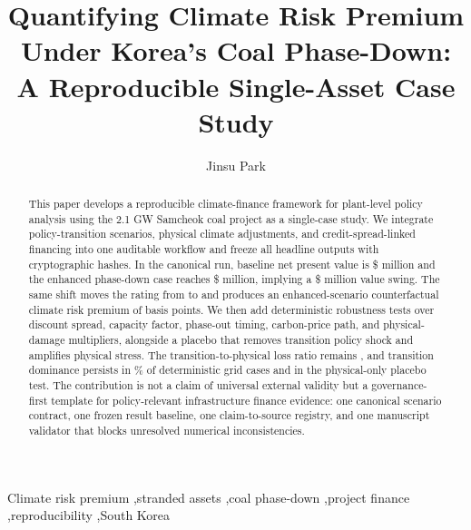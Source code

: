 \documentclass[preprint,12pt]{elsarticle}
\begin{document}



\begin{frontmatter}

\title{Quantifying Climate Risk Premium Under Korea's Coal Phase-Down: A Reproducible Single-Asset Case Study}

\author[1]{Jinsu Park}
\address[1]{PLANiT Institute, Seoul, South Korea}

\begin{abstract}
This paper develops a reproducible climate-finance framework for plant-level policy analysis using the 2.1 GW Samcheok coal project as a single-case study. We integrate policy-transition scenarios, physical climate adjustments, and credit-spread-linked financing into one auditable workflow and freeze all headline outputs with cryptographic hashes. In the canonical run, baseline net present value is \$\BaselineNPV{} million and the enhanced phase-down case reaches \$\EnhancedNPV{} million, implying a \$\NPVSwing{} million value swing. The same shift moves the rating from \BaselineRating{} to \EnhancedRating{} and produces an enhanced-scenario counterfactual climate risk premium of \EnhancedCRP{} basis points. We then add deterministic robustness tests over discount spread, capacity factor, phase-out timing, carbon-price path, and physical-damage multipliers, alongside a placebo that removes transition policy shock and amplifies physical stress. The transition-to-physical loss ratio remains \TransitionPhysicalRatio{}, and transition dominance persists in \DominanceSharePct{}\% of deterministic grid cases and in the physical-only placebo test. The contribution is not a claim of universal external validity but a governance-first template for policy-relevant infrastructure finance evidence: one canonical scenario contract, one frozen result baseline, one claim-to-source registry, and one manuscript validator that blocks unresolved numerical inconsistencies.
\end{abstract}

\begin{keyword}
Climate risk premium \sep stranded assets \sep coal phase-down \sep project finance \sep reproducibility \sep South Korea
\end{keyword}

\end{frontmatter}
\end{document}
